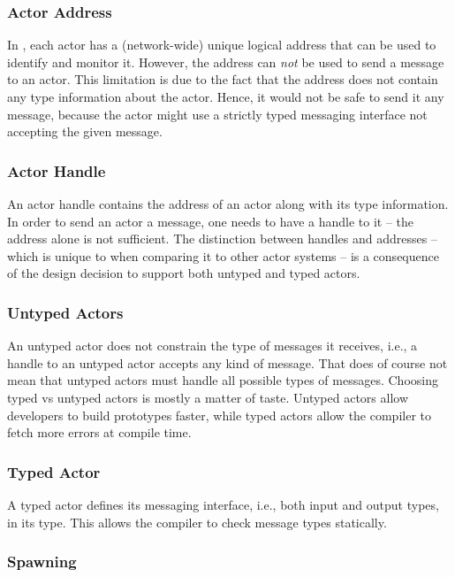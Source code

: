 \subsubsection{Actor Address}

In \lib, each actor has a (network-wide) unique logical address that can be used to identify and monitor it.
However, the address can \emph{not} be used to send a message to an actor.
This limitation is due to the fact that the address does not contain any type information about the actor.
Hence, it would not be safe to send it any message, because the actor might use a strictly typed messaging interface not accepting the given message.

\subsubsection{Actor Handle}

An actor handle contains the address of an actor along with its type information.
In order to send an actor a message, one needs to have a handle to it -- the address alone is not sufficient.
The distinction between handles and addresses -- which is unique to \lib when comparing it to other actor systems -- is a consequence of the design decision to support both untyped and typed actors.

\subsubsection{Untyped Actors}

An untyped actor does not constrain the type of messages it receives, i.e., a handle to an untyped actor accepts any kind of message.
That does of course not mean that untyped actors must handle all possible types of messages.
Choosing typed vs untyped actors is mostly a matter of taste.
Untyped actors allow developers to build prototypes faster, while typed actors allow the compiler to fetch more errors at compile time.

\subsubsection{Typed Actor}

A typed actor defines its messaging interface, i.e., both input and output types, in its type.
This allows the compiler to check message types statically.

\subsubsection{Spawning}

